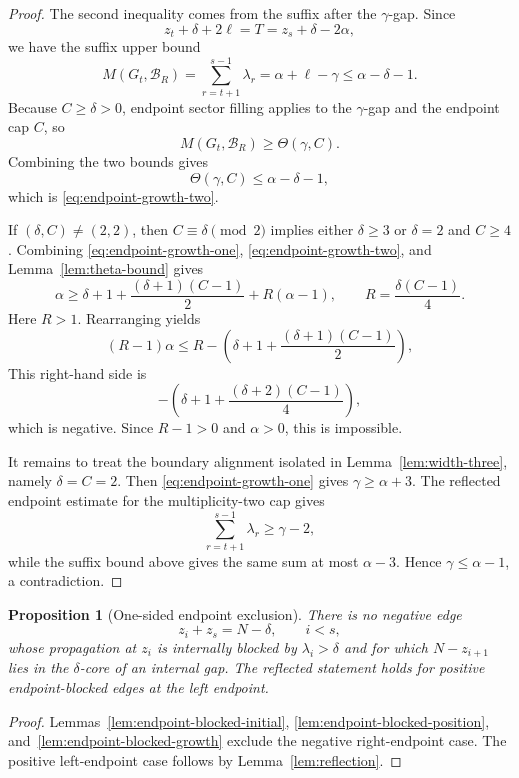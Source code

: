 \documentclass[11pt]{article}
\newtheorem{proposition}[theorem]{Proposition}
\begin{document}
\begin{proof}
The second inequality comes from the suffix after the $\gamma$-gap.  Since
\[
        z_t+\delta+2\ell=T=z_s+\delta-2\alpha,
\]
we have the suffix upper bound
\[
        M(G_t,\mathcal B_R)=\sum_{r=t+1}^{s-1}\lambda_r=\alpha+\ell-\gamma\le \alpha-\delta-1.
\]
Because $C\ge\delta>0$, endpoint sector filling applies to the $\gamma$-gap and the endpoint cap $C$, so
\[
        M(G_t,\mathcal B_R)\ge\Theta(\gamma,C).
\]
Combining the two bounds gives
\[
        \Theta(\gamma,C)\le \alpha-\delta-1,
\]
which is \eqref{eq:endpoint-growth-two}.

If $(\delta,C)\ne(2,2)$, then $C\equiv\delta\pmod2$ implies either $\delta\ge3$ or $\delta=2$ and $C\ge4$.  Combining \eqref{eq:endpoint-growth-one}, \eqref{eq:endpoint-growth-two}, and Lemma~\ref{lem:theta-bound} gives
\[
        \alpha\ge
        \delta+1+
        \frac{(\delta+1)(C-1)}2
        +R(\alpha-1),
        \qquad
        R=\frac{\delta(C-1)}4.
\]
Here $R>1$.  Rearranging yields
\[
        (R-1)\alpha
        \le
        R-
        \left(\delta+1+\frac{(\delta+1)(C-1)}2\right),
\]
This right-hand side is
\[
        -\left(\delta+1+\frac{(\delta+2)(C-1)}4\right),
\]
which is negative.  Since $R-1>0$ and $\alpha>0$, this is impossible.

It remains to treat the boundary alignment isolated in Lemma~\ref{lem:width-three}, namely $\delta=C=2$.  Then \eqref{eq:endpoint-growth-one} gives $\gamma\ge\alpha+3$.  The reflected endpoint estimate for the multiplicity-two cap gives
\[
        \sum_{r=t+1}^{s-1}\lambda_r\ge \gamma-2,
\]
while the suffix bound above gives the same sum at most $\alpha-3$.  Hence $\gamma\le\alpha-1$, a contradiction.
\end{proof}

\begin{proposition}[One-sided endpoint exclusion]\label{prop:endpoint-blocked-internal}
There is no negative edge
\[
        z_i+z_s=N-\delta,
        \qquad i<s,
\]
whose propagation at $z_i$ is internally blocked by $\lambda_i>\delta$ and for which $N-z_{i+1}$ lies in the $\delta$-core of an internal gap.  The reflected statement holds for positive endpoint-blocked edges at the left endpoint.
\end{proposition}

\begin{proof}
Lemmas~\ref{lem:endpoint-blocked-initial}, \ref{lem:endpoint-blocked-position}, and~\ref{lem:endpoint-blocked-growth} exclude the negative right-endpoint case.  The positive left-endpoint case follows by Lemma~\ref{lem:reflection}.
\end{proof}
\end{document}
